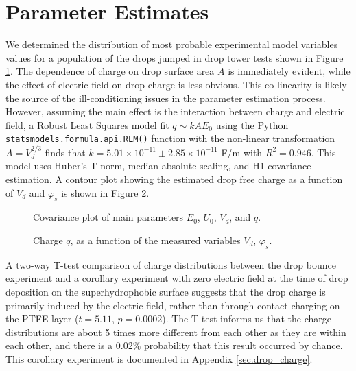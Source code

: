 \documentclass[12pt,a4paper,oneside]{book}
\begin{document}
\section{Parameter Estimates}
We determined the distribution of most probable experimental model variables values for a population of the drops jumped in drop tower tests shown in Figure \ref{fig:scatter}. The dependence of charge on drop surface area $A$ is immediately evident, while the effect of electric field on drop charge is less obvious. This co-linearity is likely the source of the ill-conditioning issues in the parameter estimation process. However, assuming the main effect is the interaction between charge and electric field, a Robust Least Squares model fit $q \sim kAE_0$ using the Python \verb|statsmodels.formula.api.RLM()| function with the non-linear transformation $A = V_d^{2/3}$ finds that $k=5.01 \times 10^{-11} \pm  2.85 \times 10^{-11}$ F/m with $R^2 = 0.946$. This model uses Huber's T norm, median absolute scaling, and H1 covariance estimation. A contour plot showing the estimated drop free charge as a function of $V_d$ and $\varphi_s$ is shown in Figure \ref{fig:charge}.
\begin{figure}[h]
    \centering
    \resizebox{12cm}{!}{}
    \caption{Covariance plot of main parameters $E_0$, $U_0$, $V_d$, and $q$.\label{fig:scatter}}
\end{figure}
\begin{figure}[h]
    \centering
    
    \caption{Charge $q$, as a function of the measured variables $V_d$, $\varphi_s$.\label{fig:charge}}
\end{figure}

A two-way T-test comparison of charge distributions between the drop bounce experiment and a corollary experiment with zero electric field at the time of drop deposition on the superhydrophobic surface suggests that the drop charge is primarily induced by the electric field, rather than through contact charging on the PTFE layer ($t = 5.11$, $p = 0.0002$). The T-test informs us that the charge distributions are about 5 times more different from each other as they are within each other, and there is a 0.02$\%$ probability that this result occurred by chance. This corollary experiment is documented in Appendix \ref{sec.drop_charge}.
\end{document}
